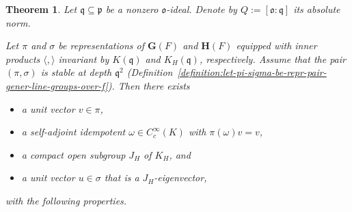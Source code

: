 \documentclass[reqno]{amsart}
\theoremstyle{plain} \newtheorem{theorem} {Theorem} \newtheorem{conjecture} {Conjecture} \newtheorem{corollary} [theorem] {Corollary} \newtheorem{proposition} [theorem] {Proposition} \newtheorem{fact} [theorem] {Fact}
\theoremstyle{definition} \newtheorem{definition} [theorem] {Definition}
\theoremstyle{itplain} %
\newcommand{\mfq}{\mathfrak{q}}
\begin{document}
\begin{theorem}\label{theorem:main-local-result}
  Let $\mfq \subseteq \mathfrak{p}$ be a nonzero $\mathfrak{o}$-ideal.  Denote by $Q := [\mathfrak{o}:\mfq]$ its absolute norm.

  Let $\pi$ and $\sigma$ be representations of $\mathbf{G}(F)$ and $\mathbf{H}(F)$ equipped with inner products $\langle , \rangle$ invariant by $K(\mfq)$ and $K_H(\mfq)$, respectively.  Assume that the pair $(\pi,\sigma)$ is stable at depth $\mfq^2$ (Definition~\ref{definition:let-pi-sigma-be-repr-pair-gener-line-groups-over-f}).  Then there exists
  \begin{itemize}
  \item a unit vector $v \in \pi$,
  \item a self-adjoint idempotent $\omega \in C_c^\infty(K)$ with $\pi(\omega) v = v$,
  \item a compact open subgroup $J_H$ of $K_H$, and
  \item a unit vector $u \in \sigma$ that is a $J_H$-eigenvector,
  \end{itemize}
  with the following properties.


\end{theorem}
\end{document}
